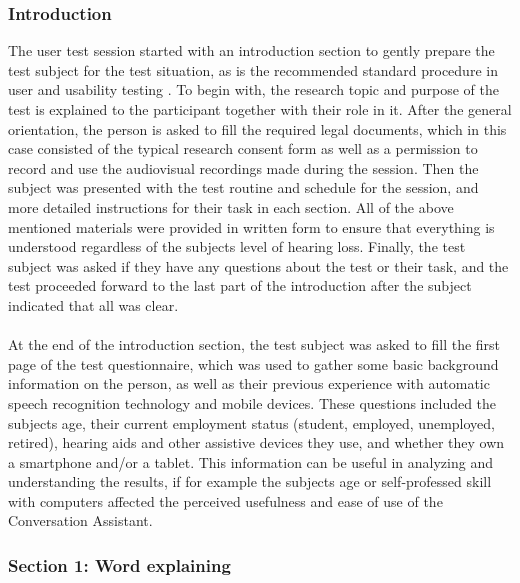 \documentclass[english, 12pt, a4paper, pdftex, elec, utf8]{aaltothesis}
\begin{document}
\subsubsection{Introduction}

The user test session started with an introduction section to gently prepare the test subject for the test situation, as is the recommended standard procedure in user and usability testing \cite{dumas1999, rubin2008handbook}. To begin with, the research topic and purpose of the test is explained to the participant together with their role in it. After the general orientation, the person is asked to fill the required legal documents, which in this case consisted of the typical research consent form as well as a permission to record and use the audiovisual recordings made during the session. Then the subject was presented with the test routine and schedule for the session, and more detailed instructions for their task in each section. All of the above mentioned materials were provided in written form to ensure that everything is understood regardless of the subjects level of hearing loss. Finally, the test subject was asked if they have any questions about the test or their task, and the test proceeded forward to the last part of the introduction after the subject indicated that all was clear. \\\\
At the end of the introduction section, the test subject was asked to fill the first page of the test questionnaire, which was used to gather some basic background information on the person, as well as their previous experience with automatic speech recognition technology and mobile devices. These questions included the subjects age, their current employment status (student, employed, unemployed, retired), hearing aids and other assistive devices they use, and whether they own a smartphone and/or a tablet. This information can be useful in analyzing and understanding the results, if for example the subjects age or self-professed skill with computers affected the perceived usefulness and ease of use of the Conversation Assistant.

\subsubsection{Section 1: Word explaining}
\end{document}
